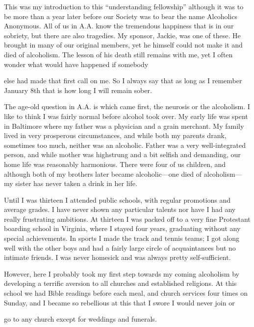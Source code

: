 This was my introduction to this “understanding fellowship” although it was to be more than a year later before our Society was to bear the name Alcoholics Anonymous. All of us in A.A. know the tremendous happiness that is in our sobriety, but there are also tragedies. My sponsor, Jackie, was one of these. He brought in many of our original members, yet he himself could not make it and died of alcoholism. The lesson of his death still remains with me, yet I often wonder what would have happened if somebody

else had made that first call on me. So I always say that as long as I remember January 8th that is how long I will remain sober.

The age-old question in A.A. is which came first, the neurosis or the alcoholism. I like to think I was fairly normal before alcohol took over. My early life was spent in Baltimore where my father was a physician and a grain merchant. My family lived in very prosperous circumstances, and while both my parents drank, sometimes too much, neither was an alcoholic. Father was a very well-integrated person, and while mother was highstrung and a bit selfish and demanding, our home life was reasonably harmonious. There were four of us children, and although both of my brothers later became alcoholic—one died of alcoholism—my sister has never taken a drink in her life.

Until I was thirteen I attended public schools, with regular promotions and average grades. I have never shown any particular talents nor have I had any really frustrating ambitions. At thirteen I was packed off to a very fine Protestant boarding school in Virginia, where I stayed four years, graduating without any special achievements. In sports I made the track and tennis teams; I got along well with the other boys and had a fairly large circle of acquaintances but no intimate friends. I was never homesick and was always pretty self-sufficient.

However, here I probably took my first step towards my coming alcoholism by developing a terrific aversion to all churches and established religions. At this school we had Bible readings before each meal, and church services four times on Sunday, and I became so rebellious at this that I swore I would never join or

go to any church except for weddings and funerals.

